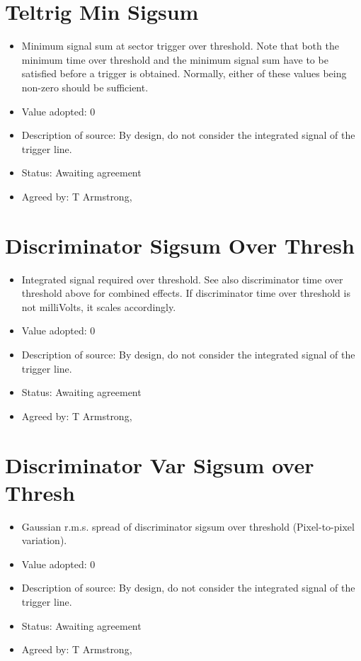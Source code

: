 \documentclass[GCT,short]{gct}
\begin{document}
\section{Teltrig Min Sigsum}
\begin{itemize}
\item Minimum signal sum at sector trigger over threshold. Note that both the minimum time over threshold and the minimum signal sum have to be satisfied before a trigger is obtained. Normally, either of these values being non-zero should be sufficient.
\item Value adopted: 0
\item Description of source: By design, do not consider the integrated signal of the trigger line.
\item Status: \color{orange}Awaiting agreement\color{black}
\item Agreed by: T Armstrong, 
\end{itemize}


\section{Discriminator Sigsum Over Thresh }
\begin{itemize}
\item Integrated signal required over threshold. See also discriminator time over threshold above for combined effects. If discriminator time over threshold is not milliVolts, it scales accordingly.
\item Value adopted: 0
\item Description of source: By design, do not consider the integrated signal of the trigger line.
\item Status: \color{orange}Awaiting agreement\color{black}
\item Agreed by: T Armstrong, 
\end{itemize}


\section{Discriminator Var Sigsum over Thresh}
\begin{itemize}
\item Gaussian r.m.s. spread of discriminator sigsum over threshold (Pixel-to-pixel variation).
\item Value adopted: 0 
\item Description of source: By design, do not consider the integrated signal of the trigger line.
\item Status: \color{orange}Awaiting agreement\color{black}
\item Agreed by: T Armstrong, 
\end{itemize}
\end{document}
